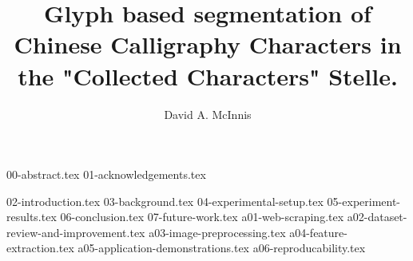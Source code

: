 \documentclass{ewuthesis}
\begin{document}
    \title{Glyph based segmentation of Chinese Calligraphy Characters in the "Collected Characters" Stelle.}
    \author{David A. McInnis}    
    
    
    
    
    \frontmatter
    \maketitle
    \makesigpage
    \makelibrarystatement{}
    {00-abstract.tex}
    {01-acknowledgements.tex}
    \mainmatter
    \tableofcontents
    \listoffigures{}
    {02-introduction.tex}
    {03-background.tex}
    {04-experimental-setup.tex}
    {05-experiment-results.tex}
    {06-conclusion.tex}
    {07-future-work.tex}
    \backmatter{}
    {a01-web-scraping.tex}
    {a02-dataset-review-and-improvement.tex}
    {a03-image-preprocessing.tex}
    {a04-feature-extraction.tex}
    {a05-application-demonstrations.tex}
    {a06-reproducability.tex}
    
    



    
    \makevita
    
    
\end{document}
